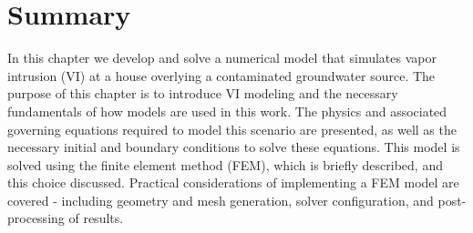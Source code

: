 \section{Summary}

In this chapter we develop and solve a numerical model that simulates vapor intrusion (VI) at a house overlying a contaminated groundwater source.
The purpose of this chapter is to introduce VI modeling and the necessary fundamentals of how models are used in this work.
The physics and associated governing equations required to model this scenario are presented, as well as the necessary initial and boundary conditions to solve these equations.
This model is solved using the finite element method (FEM), which is briefly described, and this choice discussed.
Practical considerations of implementing a FEM model are covered - including geometry and mesh generation, solver configuration, and post-processing of results.
